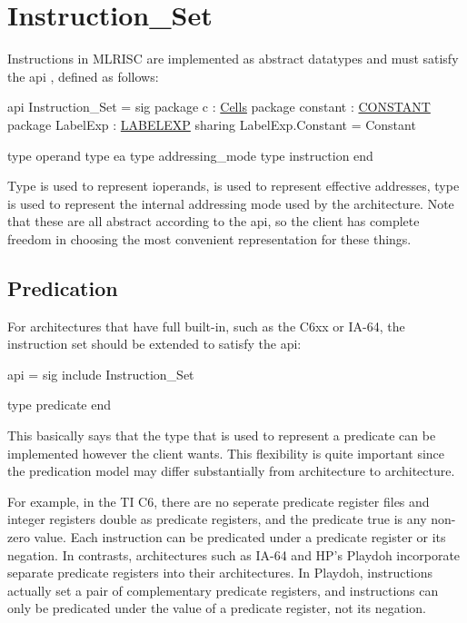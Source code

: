 \section{Instruction_Set}

  Instructions in MLRISC are implemented as abstract datatypes and
must satisfy the api 
, defined as follows:

\begin{SML}
api Instruction_Set =
sig
   package c        : \href{cells.html}{Cells}
   package constant : \href{constants.html}{CONSTANT}
   package LabelExp : \href{labelexp.html}{LABELEXP}
      sharing LabelExp.Constant = Constant

   type operand   
   type ea         
   type addressing_mode
   type instruction 
end
\end{SML}

Type  is used to represent ioperands,
 is used to represent effective addresses, type 
 is used to represent the internal addressing mode
used by the architecture.  Note that these are all abstract according to 
the api, so the client has complete freedom in choosing the most
convenient representation for these things.

\subsection{Predication}
   For architectures that have full 
built-in, such as the C6xx or IA-64, the instruction set should be
extended to satisfy the api: 
\begin{SML}
api  =
sig
   include Instruction_Set
   
   type predicate  
end
\end{SML}
This basically says that the type that is used to represent a predicate
can be implemented however the client wants.  This flexibility
is quite important since the predication model may differ substantially
from architecture to architecture.

For example, in the TI C6, there are no seperate predicate register files
and integer registers double as predicate registers, and the predicate
true is any non-zero value.  Each instruction can be predicated under a
predicate register or its negation.  In contrasts, architectures such as
IA-64 and HP's Playdoh incorporate separate predicate registers into their 
architectures.  In Playdoh,  instructions 
actually set a pair of complementary predicate registers, 
and instructions can only
be predicated under the value of a predicate register, not its negation.

